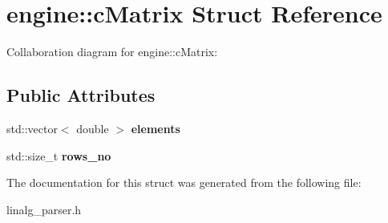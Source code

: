 \hypertarget{structengine_1_1cMatrix}{\section{engine\-:\-:c\-Matrix Struct Reference}
\label{structengine_1_1cMatrix}
}


Collaboration diagram for engine\-:\-:c\-Matrix\-:
\subsection*{Public Attributes}
\begin{DoxyCompactItemize}
\item 
\hypertarget{structengine_1_1cMatrix_a8124c960bd951f09fd4359e8287adf6c}{std\-::vector$<$ double $>$ {\bfseries elements}}\label{structengine_1_1cMatrix_a8124c960bd951f09fd4359e8287adf6c}

\item 
\hypertarget{structengine_1_1cMatrix_af4c58d1e785c85463ffb8df2198420e4}{std\-::size\-\_\-t {\bfseries rows\-\_\-no}}\label{structengine_1_1cMatrix_af4c58d1e785c85463ffb8df2198420e4}

\end{DoxyCompactItemize}


The documentation for this struct was generated from the following file\-:\begin{DoxyCompactItemize}
\item 
linalg\-\_\-parser.\-h\end{DoxyCompactItemize}
